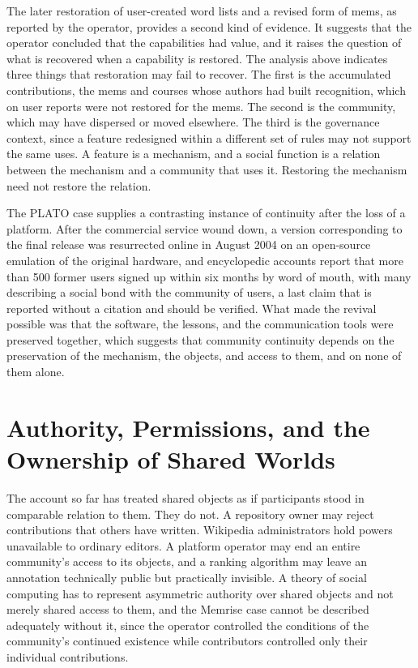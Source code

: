 \documentclass[11pt]{article}
\theoremstyle{remark}
\begin{document}
The later restoration of user-created word lists and a revised form of mems, as reported by the operator, provides a second kind of evidence. It suggests that the operator concluded that the capabilities had value, and it raises the question of what is recovered when a capability is restored. The analysis above indicates three things that restoration may fail to recover. The first is the accumulated contributions, the mems and courses whose authors had built recognition, which on user reports were not restored for the mems. The second is the community, which may have dispersed or moved elsewhere. The third is the governance context, since a feature redesigned within a different set of rules may not support the same uses. A feature is a mechanism, and a social function is a relation between the mechanism and a community that uses it. Restoring the mechanism need not restore the relation.

The PLATO case supplies a contrasting instance of continuity after the loss of a platform. After the commercial service wound down, a version corresponding to the final release was resurrected online in August 2004 on an open-source emulation of the original hardware, and encyclopedic accounts report that more than 500 former users signed up within six months by word of mouth, with many describing a social bond with the community of users, a last claim that is reported without a citation and should be verified. What made the revival possible was that the software, the lessons, and the communication tools were preserved together, which suggests that community continuity depends on the preservation of the mechanism, the objects, and access to them, and on none of them alone.

\section{Authority, Permissions, and the Ownership of Shared Worlds}
\label{sec:authority}

The account so far has treated shared objects as if participants stood in comparable relation to them. They do not. A repository owner may reject contributions that others have written. Wikipedia administrators hold powers unavailable to ordinary editors. A platform operator may end an entire community's access to its objects, and a ranking algorithm may leave an annotation technically public but practically invisible. A theory of social computing has to represent asymmetric authority over shared objects and not merely shared access to them, and the Memrise case cannot be described adequately without it, since the operator controlled the conditions of the community's continued existence while contributors controlled only their individual contributions.
\end{document}
